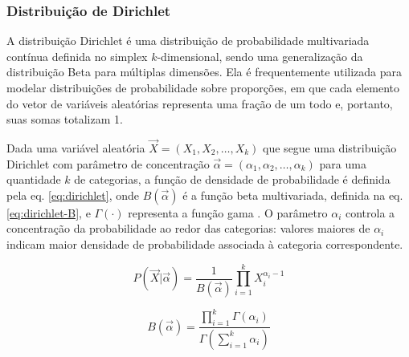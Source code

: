 


\subsubsection{Distribuição de Dirichlet}
\label{sec:modelo-dir}

A distribuição Dirichlet \cite{distbook-dirichlet} é uma distribuição de probabilidade multivariada contínua definida no simplex \( k \)-dimensional, sendo uma generalização da distribuição Beta \cite{distbook-beta} para múltiplas dimensões. Ela é frequentemente utilizada para modelar distribuições de probabilidade sobre proporções, em que cada elemento do vetor de variáveis aleatórias representa uma fração de um todo e, portanto, suas somas totalizam 1.

Dada uma variável aleatória \( \vec{X} = (X_1, X_2, \dots, X_k) \) que segue uma distribuição Dirichlet com parâmetro de concentração \( \vec{\alpha} = (\alpha_1, \alpha_2, \dots, \alpha_k) \) para uma quantidade $k$ de categorias, a função de densidade de probabilidade é definida pela eq. \eqref{eq:dirichlet}, onde \( B(\vec{\alpha}) \) é a função beta multivariada, definida na eq. \eqref{eq:dirichlet-B}, e \( \Gamma(\cdot) \) representa a função gama \cite{distbook-gamma}. O parâmetro \( \alpha_i \) controla a concentração da probabilidade ao redor das categorias: valores maiores de \( \alpha_i \) indicam maior densidade de probabilidade associada à categoria correspondente.

\begin{equation}\label{eq:dirichlet}
  P(\vec{X} | \vec{\alpha}) = \frac{1}{B (\vec{\alpha})} \prod_{i=1}^k X_i^{\alpha_i - 1}
\end{equation}

\begin{equation}\label{eq:dirichlet-B}
  B(\vec{\alpha}) = \frac{\prod_{i=1}^k \Gamma(\alpha_i)}{\Gamma\left(\sum_{i=1}^k \alpha_i\right)}
\end{equation}


